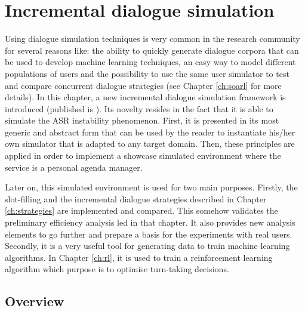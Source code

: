 \chapter{Incremental dialogue simulation}
\label{ch:simulation}

	
	Using dialogue simulation techniques is very common in the research community \cite{Eckert1997,Pietquin2013} for several reasons like: the ability to quickly generate dialogue corpora that can be used to develop machine learning techniques, an easy way to model different populations of users and the possibility to use the same user simulator to test and compare concurrent dialogue strategies (see Chapter \ref{ch:soarl} for more details). In this chapter, a new incremental dialogue simulation framework is introduced (published is \cite{Khouzaimi2016a}). Its novelty resides in the fact that it is able to simulate the ASR instability phenomenon. First, it is presented in its most generic and abstract form that can be used by the reader to instantiate his/her own simulator that is adapted to any target domain. Then, these principles are applied in order to implement a showcase simulated environment where the service is a personal agenda manager.
	
	Later on, this simulated environment is used for two main purposes. Firstly, the slot-filling and the incremental dialogue strategies described in Chapter \ref{ch:strategies} are implemented and compared. This somehow validates the preliminary efficiency analysis led in that chapter. It also provides new analysis elements to go further and prepare a basis for the experiments with real users. Secondly, it is a very useful tool for generating data to train machine learning algorithms. In Chapter \ref{ch:rl}, it is used to train a reinforcement learning algorithm which purpose is to optimise turn-taking decisions.
						
\section{Overview}
	
